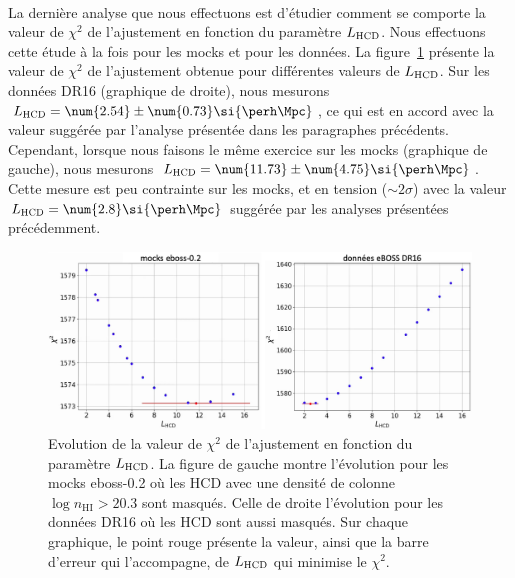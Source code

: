 \paragraph{}
La dernière analyse que nous effectuons est d'étudier comment se comporte la valeur de $\chi^2$ de l'ajustement en fonction du paramètre $L_{\textsc{HCD}}$. Nous effectuons cette étude à la fois pour les mocks et pour les données.
La figure~\ref{fig:L0_free} présente la valeur de $\chi^2$ de l'ajustement obtenue pour différentes valeurs de $L_{\textsc{HCD}}$.
Sur les données DR16 (graphique de droite), nous mesurons $L_{\textsc{HCD}} = \num{2.54} \pm \num{0.73} \si{\perh\Mpc}$, ce qui est en accord avec la valeur suggérée par l'analyse présentée dans les paragraphes précédents.
Cependant, lorsque nous faisons le même exercice sur les mocks (graphique de gauche), nous mesurons $L_{\textsc{HCD}} = \num{11.73} \pm \num{4.75} \si{\perh\Mpc}$. Cette mesure est peu contrainte sur les mocks, et en tension ($\sim 2 \sigma$) avec la valeur $L_{\textsc{HCD}} = \num{2.8} \si{\perh\Mpc}$ suggérée par les analyses présentées précédemment.

\begin{figure}
  \centering
  \includegraphics[scale=0.36]{L0_free}
  \caption{Evolution de la valeur de $\chi^2$ de l'ajustement en fonction du paramètre $L_{\textsc{HCD}}$. La figure de gauche montre l'évolution pour les mocks eboss-0.2 où les HCD avec une densité de colonne $\log n_{\mathrm{HI}} > \num{20.3}$ sont masqués. Celle de droite l'évolution pour les données DR16 où les HCD sont aussi masqués. Sur chaque graphique, le point rouge présente la valeur, ainsi que la barre d'erreur qui l'accompagne, de $L_{\textsc{HCD}}$ qui minimise le $\chi^2$.}
  \label{fig:L0_free}
\end{figure}

